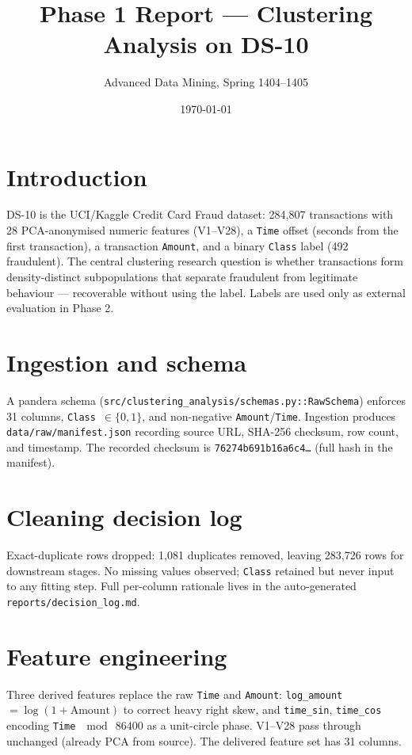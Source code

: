 \documentclass[11pt, a4paper]{article}
\title{\textbf{Phase 1 Report — Clustering Analysis on DS-10}}
\author{Advanced Data Mining, Spring 1404--1405}
\date{\today}
\begin{document}
\maketitle

\section{Introduction}
DS-10 is the UCI/Kaggle Credit Card Fraud dataset: 284{,}807 transactions with 28 PCA-anonymised numeric features (V1--V28), a \texttt{Time} offset (seconds from the first transaction), a transaction \texttt{Amount}, and a binary \texttt{Class} label (492 fraudulent). The central clustering research question is whether transactions form density-distinct subpopulations that separate fraudulent from legitimate behaviour --- recoverable without using the label. Labels are used only as external evaluation in Phase 2.

\section{Ingestion and schema}
A pandera schema (\texttt{src/clustering\_analysis/schemas.py::RawSchema}) enforces 31 columns, \texttt{Class}~$\in \{0,1\}$, and non-negative \texttt{Amount}/\texttt{Time}. Ingestion produces \texttt{data/raw/manifest.json} recording source URL, SHA-256 checksum, row count, and timestamp. The recorded checksum is \texttt{76274b691b16a6c4\ldots} (full hash in the manifest).

\section{Cleaning decision log}
Exact-duplicate rows dropped: 1{,}081 duplicates removed, leaving 283{,}726 rows for downstream stages. No missing values observed; \texttt{Class} retained but never input to any fitting step. Full per-column rationale lives in the auto-generated \texttt{reports/decision\_log.md}.

\section{Feature engineering}
Three derived features replace the raw \texttt{Time} and \texttt{Amount}: \texttt{log\_amount}~$= \log(1 + \mathrm{Amount})$ to correct heavy right skew, and \texttt{time\_sin}, \texttt{time\_cos} encoding \texttt{Time}~$\bmod\ 86400$ as a unit-circle phase. V1--V28 pass through unchanged (already PCA from source). The delivered feature set has 31 columns.
\end{document}
